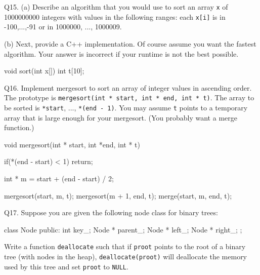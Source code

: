 \newpage
Q15.
(a) Describe an algorithm that you would
use to sort an array \verb!x! of 1000000000 integers with values
    in the following ranges: each \verb!x[i]! is in -100,...,-91
    or in 1000000, ..., 1000009.
    
\ANSWER
\begin{answercode}

\end{answercode}

(b)
Next, provide a C++ implementation.
Of course assume you want the fastest algorithm.
Your answer is incorrect if your runtime is not the best possible.

\ANSWER
\begin{answercode}
void sort(int x[])
{
    int t[10];    
}      
\end{answercode}




\newpage
Q16.
Implement mergesort to sort an array of integer values in ascending order.
The prototype is \verb!mergesort(int * start, int * end, int * t)!.
The array to be sorted is \verb!*start!, ..., \verb!*(end - 1)!.
You may assume \verb!t! points to a temporary array that is large
enough for your mergesort.
(You probably want a merge function.)

\ANSWER
\begin{answercode}

void mergesort(int * start, int *end, int * t)
{
  if(*(end - start) < 1)
    return;

  int * m = start + (end - start) / 2;

  mergesort(start, m, t);
  mergesort(m + 1, end, t);
  merge(start, m, end, t);
}
\end{answercode}





\newpage
Q17.
Suppose you are given the following node class for binary trees:
\begin{console}
class Node
{
public:
    int key_;
    Node * parent_;
    Node * left_;
    Node * right_;
};
\end{console}
Write a function \verb!deallocate! such that if \verb!proot!
points to the root of a binary tree (with nodes in the heap),
\verb!deallocate(proot)! will deallocate the memory used by this tree
and set \verb!proot! to \verb!NULL!.

